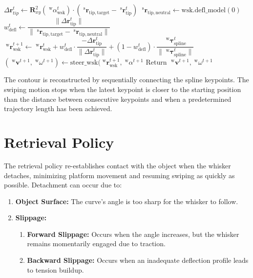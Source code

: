 \begin{algorithm}[htb]
\begin{algorithmic}[1]
        \State \(\Delta\boldsymbol{r}_{tip}^{t} \gets \boldsymbol{R}_{xy}^{2}(\; ^{\mathrm{w}}\alpha_{\mathrm{wsk}}^{t}) \cdot (\;^{\mathrm{s}}\boldsymbol{r}_{\mathrm{tip, target}} - \;^{\mathrm{s}}\boldsymbol{r}_{\mathrm{tip}}^{t})\) 
        \State \(\;^{\mathrm{s}}\boldsymbol{r}_{\mathrm{tip, neutral}} \gets \mathrm{wsk.defl\_model}(0)\) 
        \State \colorbox{green!40}{\(w_{\mathrm{defl}}^{t} \gets \dfrac{\|\Delta\boldsymbol{r}_{\mathrm{tip}}^{t}\|}{\|\;^{\mathrm{s}}\boldsymbol{r}_{\mathrm{tip, target}} - \;^{\mathrm{s}}\boldsymbol{r}_{\mathrm{tip, neutral}}\|}\)}
        \State \colorbox{green!40}{\(\;^{\mathrm{w}}\boldsymbol{r}_{\mathrm{wsk}}^{t+1} \gets \;^{\mathrm{w}}\boldsymbol{r}_{\mathrm{wsk}}^{t} + w_{\mathrm{defl}}^{t} \cdot \dfrac{-\Delta\boldsymbol{r}_{\mathrm{tip}}^{t}}{\|\Delta\boldsymbol{r}_{\mathrm{tip}}^{t}\|} + (1 - w_{\mathrm{defl}}^{t}) \cdot \dfrac{\;^{\mathrm{w}}\boldsymbol{\tau}_{\mathrm{spline}}^{t}}{\|\;^{\mathrm{w}}\boldsymbol{\tau}_{\mathrm{spline}}^{t}\|}\)} 
        \State \((\;^{\mathrm{w}}\boldsymbol{v}^{t+1}, \;^{\mathrm{w}}\omega^{t+1}) \gets \mathrm{steer\_wsk}(\;^{\mathrm{w}}\boldsymbol{r}_{\mathrm{wsk}}^{t+1},\;^{\mathrm{w}}\alpha^{t+1}\)
        \State Return \(\;^{\mathrm{w}}\boldsymbol{v}^{t+1}, \;^{\mathrm{w}}\omega^{t+1}\)
    \end{algorithmic}
    \label{alg:swiping_policy}
\end{algorithm}

The contour is reconstructed by sequentially connecting the spline keypoints.
The swiping motion stops when the latest keypoint is closer to the starting position than the distance between consecutive keypoints and when a predetermined trajectory length has been achieved.


\section{Retrieval Policy}

The retrieval policy re-establishes contact with the object when the whisker detaches, minimizing platform movement and resuming swiping as quickly as possible.
Detachment can occur due to:
\begin{enumerate}
    \item \textbf{Object Surface:} The curve's angle is too sharp for the whisker to follow.
    \item \textbf{Slippage:}
    \begin{enumerate}
        \item \textbf{Forward Slippage:} Occurs when the angle increases, but the whisker remains momentarily engaged due to traction.
        \item \textbf{Backward Slippage:} Occurs when an inadequate deflection profile leads to tension buildup.
    \end{enumerate}
\end{enumerate}

